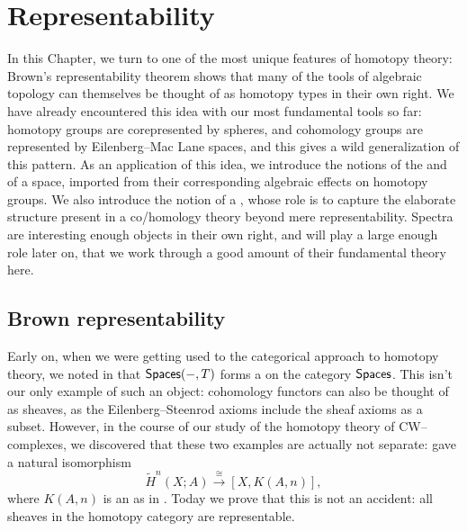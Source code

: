 
\chapter{Representability}\label{RepChap}

In this Chapter, we turn to one of the most unique features of homotopy theory: Brown's representability theorem shows that many of the tools of algebraic topology can themselves be thought of as homotopy types in their own right.
We have already encountered this idea with our most fundamental tools so far: homotopy groups are corepresented by spheres, and cohomology groups are represented by Eilenberg--Mac Lane spaces, and this gives a wild generalization of this pattern.
As an application of this idea, we introduce the notions of the  and  of a space, imported from their corresponding algebraic effects on homotopy groups.
We also introduce the notion of a , whose role is to capture the elaborate structure present in a co/homology theory beyond mere representability.
Spectra are interesting enough objects in their own right, and will play a large enough role later on, that we work through a good amount of their fundamental theory here.





\section{Brown representability}\label{BrownRepSec}

Early on, when we were getting used to the categorical approach to homotopy theory, we noted in  that $\mathsf{Spaces}(-, T)$ forms a  on the category $\mathsf{Spaces}$.
This isn't our only example of such an object: cohomology functors can also be thought of as sheaves, as the Eilenberg--Steenrod axioms include the sheaf axioms as a subset.
However, in the course of our study of the homotopy theory of CW--complexes, we discovered that these two examples are actually not separate:  gave a natural isomorphism \[\widetilde H^n(X; A) \xrightarrow\cong [X, K(A, n)],\] where $K(A, n)$ is an  as in .
Today we prove that this is not an accident: all sheaves in the homotopy category are representable.

